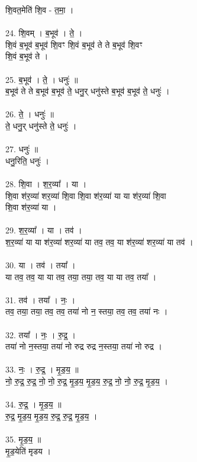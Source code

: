 शि॒वत॒मेति॑ शि॒व - त॒मा॒ ।\\
\\
24. शि॒वम् । ब॒भूव॑ । ते॒ ।\\
शि॒वं ब॒भूव॑ ब॒भूव॑ शि॒वꣳ शि॒वं ब॒भूव॑ ते ते ब॒भूव॑ शि॒वꣳ\\
शि॒वं ब॒भूव॑ ते ।\\
\\
25. ब॒भूव॑ । ते॒ । धनुः॑ ॥\\
ब॒भूव॑ ते ते ब॒भूव॑ ब॒भूव॑ ते॒ धनु॒र् धनु॑स्ते ब॒भूव॑ ब॒भूव॑ ते॒ धनुः॑ ।\\
\\
26. ते॒ । धनुः॑ ॥\\
ते॒ धनु॒र् धनु॑स्ते ते॒ धनुः॑ ।\\
\\
27. धनुः॑ ॥\\
धनु॒रिति॒ धनुः॑ ।\\
\\
28. शि॒वा । श॒र॒व्या᳚ । या ।\\
शि॒वा श॑र॒व्या॑ शर॒व्या॑ शि॒वा शि॒वा श॑र॒व्या॑ या या श॑र॒व्या॑ शि॒वा\\
शि॒वा श॑र॒व्या॑ या ।\\
\\
29. श॒र॒व्या᳚ । या । तव॑ ।\\
श॒र॒व्या॑ या या श॑र॒व्या॑ शर॒व्या॑ या तव॒ तव॒ या श॑र॒व्या॑ शर॒व्या॑ या तव॑ ।\\
\\
30. या । तव॑ । तया᳚ ।\\
या तव॒ तव॒ या या तव॒ तया॒ तया॒ तव॒ या या तव॒ तया᳚ ।\\
\\
31. तव॑ । तया᳚ । नः॒ ।\\
तव॒ तया॒ तया॒ तव॒ तव॒ तया॑ नो न॒ स्तया॒ तव॒ तव॒ तया॑ नः ।\\
\\
32. तया᳚ । नः॒ । रु॒द्र॒ ।\\
तया॑ नो न॒स्तया॒ तया॑ नो रुद्र रुद्र न॒स्तया॒ तया॑ नो रुद्र ।\\
\\
33. नः॒ । रु॒द्र॒ । मृ॒ड॒य॒ ॥\\
नो॒ रु॒द्र॒ रु॒द्र॒ नो॒ नो॒ रु॒द्र॒ मृ॒ड॒य॒ मृ॒ड॒य॒ रु॒द्र॒ नो॒ नो॒ रु॒द्र॒ मृ॒ड॒य॒ ।\\
\\
34. रु॒द्र॒ । मृ॒ड॒य॒ ॥\\
रु॒द्र॒ मृ॒ड॒य॒ मृ॒ड॒य॒ रु॒द्र॒ रु॒द्र॒ मृ॒ड॒य॒ ।\\
\\
35. मृ॒ड॒य॒ ॥\\
मृ॒ड॒येति॑ मृडय ।\\
